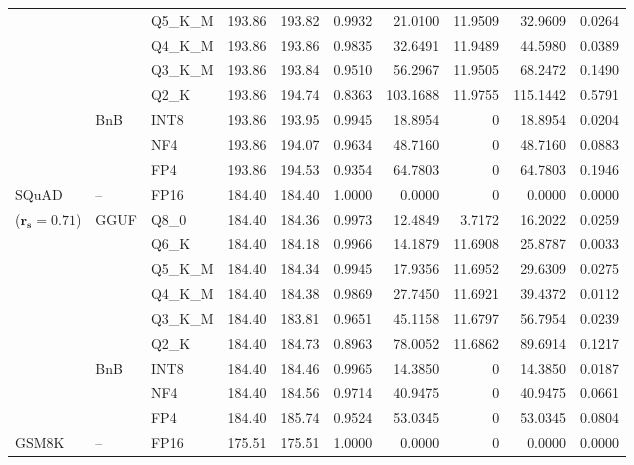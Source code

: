 \begin{longtable}{ll l rrrrrrr}
 &  & Q5\_K\_M & 193.86 & 193.82 & 0.9932 & 21.0100 & 11.9509 & 32.9609 & 0.0264 \\
 &  & Q4\_K\_M & 193.86 & 193.86 & 0.9835 & 32.6491 & 11.9489 & 44.5980 & 0.0389 \\
 &  & Q3\_K\_M & 193.86 & 193.84 & 0.9510 & 56.2967 & 11.9505 & 68.2472 & 0.1490 \\
 &  & Q2\_K & 193.86 & 194.74 & \cellcolor{red!18} 0.8363 & \cellcolor{red!18} 103.1688 & 11.9755 & \cellcolor{red!18} 115.1442 & \cellcolor{red!18} 0.5791 \\
 & BnB & INT8 & 193.86 & 193.95 & 0.9945 & 18.8954 & \cellcolor{cyan!12} $0$ & 18.8954 & 0.0204 \\
 &  & NF4 & 193.86 & 194.07 & 0.9634 & 48.7160 & \cellcolor{cyan!12} $0$ & 48.7160 & 0.0883 \\
 &  & FP4 & 193.86 & 194.53 & \cellcolor{red!18} 0.9354 & \cellcolor{red!18} 64.7803 & \cellcolor{cyan!12} $0$ & \cellcolor{red!18} 64.7803 & \cellcolor{red!18} 0.1946 \\
\midrule
SQuAD & -- & FP16 & 184.40 & 184.40 & 1.0000 & 0.0000 & \cellcolor{cyan!12} $0$ & 0.0000 & 0.0000 \\
{\small ($\mathbf{r_s{=}0.71}$)} & GGUF & Q8\_0 & 184.40 & 184.36 & 0.9973 & 12.4849 & 3.7172 & 16.2022 & 0.0259 \\
 &  & Q6\_K & 184.40 & 184.18 & 0.9966 & 14.1879 & 11.6908 & 25.8787 & 0.0033 \\
 &  & Q5\_K\_M & 184.40 & 184.34 & 0.9945 & 17.9356 & 11.6952 & 29.6309 & 0.0275 \\
 &  & Q4\_K\_M & 184.40 & 184.38 & 0.9869 & 27.7450 & 11.6921 & 39.4372 & 0.0112 \\
 &  & Q3\_K\_M & 184.40 & 183.81 & 0.9651 & 45.1158 & 11.6797 & 56.7954 & 0.0239 \\
 &  & Q2\_K & 184.40 & 184.73 & \cellcolor{red!18} 0.8963 & \cellcolor{red!18} 78.0052 & 11.6862 & \cellcolor{red!18} 89.6914 & \cellcolor{red!18} 0.1217 \\
 & BnB & INT8 & 184.40 & 184.46 & 0.9965 & 14.3850 & \cellcolor{cyan!12} $0$ & 14.3850 & 0.0187 \\
 &  & NF4 & 184.40 & 184.56 & 0.9714 & 40.9475 & \cellcolor{cyan!12} $0$ & 40.9475 & 0.0661 \\
 &  & FP4 & 184.40 & 185.74 & 0.9524 & 53.0345 & \cellcolor{cyan!12} $0$ & 53.0345 & 0.0804 \\
\midrule
GSM8K & -- & FP16 & 175.51 & 175.51 & 1.0000 & 0.0000 & \cellcolor{cyan!12} $0$ & 0.0000 & 0.0000 \\

\end{longtable}
